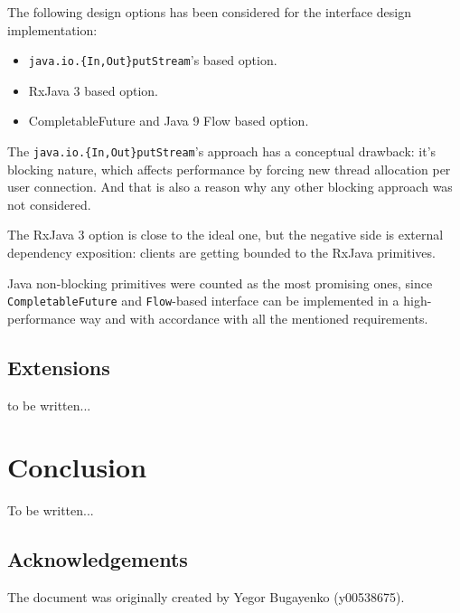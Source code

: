 \documentclass[12pt,oneside]{article}
\newcommand\dd[1]{\colorbox{gray!30}{\texttt{#1}}}
\begin{document}
The following design options has been considered for the interface design implementation:
\begin{itemize}
  \item \dd{java.io.\{In,Out\}putStream}'s based option. 
  \item RxJava 3 based option.
	\item CompletableFuture and Java 9 Flow based option.
\end{itemize}

The \dd{java.io.\{In,Out\}putStream}'s approach has a conceptual drawback: it's blocking nature,
which affects performance by forcing new thread allocation per user connection. And that is
also a reason why any other blocking approach was not considered.

The RxJava 3 option is close to the ideal one, but the negative side is external
dependency exposition: clients are getting bounded to the RxJava primitives. 

Java non-blocking primitives were counted as the most promising
ones, since \dd{CompletableFuture} and \dd{Flow}-based interface can be implemented in a 
high-performance way and with accordance with all the mentioned requirements.

\subsection{Extensions}
to be written...

\section{Conclusion}
\label{sec:conclusion}

To be written...

\subsection{Acknowledgements}
\label{sec:ack}

The document was originally created by Yegor Bugayenko (y00538675).

\printbibliography%
\end{document}
